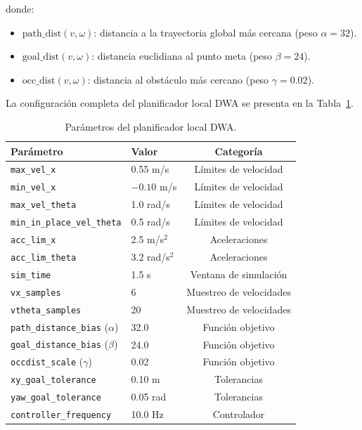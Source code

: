 \documentclass[12pt,letterpaper]{article}
\begin{document}
donde:

\begin{itemize}
    \item $\text{path\_dist}(v, \omega)$: distancia a la trayectoria global más cercana (peso $\alpha=32$).
    \item $\text{goal\_dist}(v, \omega)$: distancia euclidiana al punto meta (peso $\beta=24$).
    \item $\text{occ\_dist}(v, \omega)$: distancia al obstáculo más cercano (peso $\gamma=0.02$).
\end{itemize}

La configuración completa del planificador local DWA se presenta en la Tabla~\ref{tab:dwa_params}.

\begin{table}[H]
    \centering
    \caption{Parámetros del planificador local DWA.}
    \label{tab:dwa_params}
    \small
    \begin{tabular}{llc}
        \hline
        \textbf{Parámetro} & \textbf{Valor} & \textbf{Categoría} \\
        \hline
        \texttt{max\_vel\_x} & 0.55 m/s & Límites de velocidad \\
        \texttt{min\_vel\_x} & $-0.10$ m/s & Límites de velocidad \\
        \texttt{max\_vel\_theta} & 1.0 rad/s & Límites de velocidad \\
        \texttt{min\_in\_place\_vel\_theta} & 0.5 rad/s & Límites de velocidad \\
        \texttt{acc\_lim\_x} & 2.5 m/s$^2$ & Aceleraciones \\
        \texttt{acc\_lim\_theta} & 3.2 rad/s$^2$ & Aceleraciones \\
        \texttt{sim\_time} & 1.5 s & Ventana de simulación \\
        \texttt{vx\_samples} & 6 & Muestreo de velocidades \\
        \texttt{vtheta\_samples} & 20 & Muestreo de velocidades \\
        \texttt{path\_distance\_bias} ($\alpha$) & 32.0 & Función objetivo \\
        \texttt{goal\_distance\_bias} ($\beta$) & 24.0 & Función objetivo \\
        \texttt{occdist\_scale} ($\gamma$) & 0.02 & Función objetivo \\
        \texttt{xy\_goal\_tolerance} & 0.10 m & Tolerancias \\
        \texttt{yaw\_goal\_tolerance} & 0.05 rad & Tolerancias \\
        \texttt{controller\_frequency} & 10.0 Hz & Controlador \\
        \hline
    \end{tabular}
\end{table}
\end{document}
